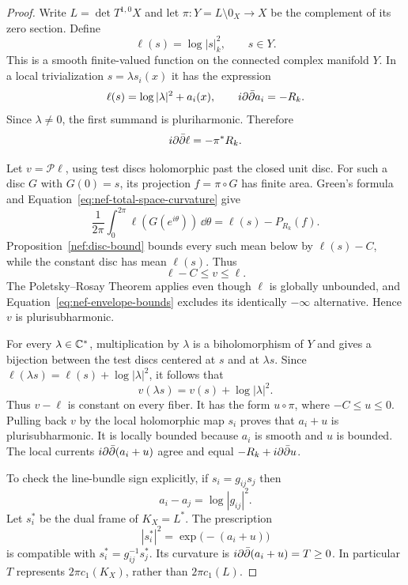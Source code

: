 \begin{proof}
Write $L=\det T^{1,0}X$ and let $\pi:Y=L\setminus 0_X\to X$ be
the complement of its zero section.  Define
\[
 \ell(s)=\log|s|_k^2,\qquad s\in Y.
\]
This is a smooth finite-valued function on the connected complex
manifold $Y$.  In a local trivialization $s=\lambda s_i(x)$ it has
the expression
\[
 \ell(s)=\log|\lambda|^2+a_i(x),\qquad
 i\partial\bar\partial a_i=-R_k.
\]
Since $\lambda\ne0$, the first summand is pluriharmonic.  Therefore
\begin{equation}
 i\partial\bar\partial\ell=-\pi^*R_k.
 \label{eq:nef-total-space-curvature}
\end{equation}

Let $v=\mathcal P\ell$, using test discs holomorphic past the closed
unit disc.  For such a disc $G$ with $G(0)=s$, its projection
$f=\pi\circ G$ has finite area.  Green's formula and
Equation~\eqref{eq:nef-total-space-curvature} give
\[
 \frac{1}{2\pi}\int_0^{2\pi}\ell(G(e^{i\theta}))\,\dd\theta
 =\ell(s)-P_{R_k}(f).
\]
Proposition~\ref{nef:disc-bound} bounds every such mean below by
$\ell(s)-C$, while the constant disc has mean $\ell(s)$.  Thus
\begin{equation}
 \ell-C\leq v\leq\ell.
 \label{eq:nef-envelope-bounds}
\end{equation}
The Poletsky--Rosay Theorem applies even though $\ell$ is globally
unbounded, and Equation~\eqref{eq:nef-envelope-bounds} excludes its
identically $-\infty$ alternative.  Hence $v$ is plurisubharmonic.

For every $\lambda\in\mathbb C^*$, multiplication by $\lambda$ is a
biholomorphism of $Y$ and gives a bijection between the test discs
centered at $s$ and at $\lambda s$.  Since
$\ell(\lambda s)=\ell(s)+\log|\lambda|^2$, it follows that
\[
 v(\lambda s)=v(s)+\log|\lambda|^2.
\]
Thus $v-\ell$ is constant on every fiber.  It has the form
$u\circ\pi$, where $-C\leq u\leq0$.  Pulling back $v$ by the local
holomorphic map $s_i$ proves that $a_i+u$ is plurisubharmonic.
It is locally bounded because $a_i$ is smooth and $u$ is bounded.
The local currents $i\partial\bar\partial(a_i+u)$ agree and equal $-R_k+i\partial\bar\partial u$.

To check the line-bundle sign explicitly, if $s_i=g_{ij}s_j$ then
\[
 a_i-a_j=\log|g_{ij}|^2.
\]
Let $s_i^*$ be the dual frame of $K_X=L^*$.  The prescription
\[
 |s_i^*|^2=\exp\bigl(-(a_i+u)\bigr)
\]
is compatible with $s_i^*=g_{ij}^{-1}s_j^*$.  Its curvature is
$i\partial\bar\partial(a_i+u)=T\geq0$.  In particular $T$ represents
$2\pi c_1(K_X)$, rather than $2\pi c_1(L)$.
\end{proof}

